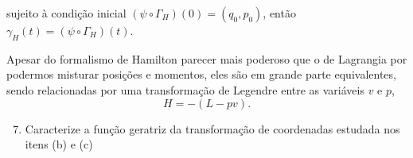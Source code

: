 \begin{enumerate}
\begin{enumerate}
                sujeito à condição inicial $(\psi\circ\Gamma_H)(0)=(q_0,p_0)$,
                então $\gamma_H(t)=(\psi\circ\Gamma_H)(t)$.
        \end{enumerate}
        Apesar do formalismo de Hamilton parecer mais poderoso que o de
        Lagrangia por podermos misturar posições e momentos, eles são em grande
        parte equivalentes, sendo relacionadas por uma transformação de Legendre
        entre as variáveis $v$ e $p$,
        $$H=-(L-pv).$$
        \begin{enumerate}
            \setcounter{enumii}{6}
            \item
                Caracterize a função geratriz da transformação de coordenadas
                estudada nos itens (b) e (c)
        \end{enumerate}
\end{enumerate}

